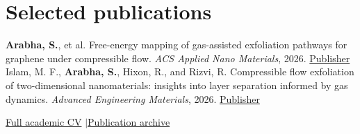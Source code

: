 \documentclass[11pt,letterpaper]{article}
\begin{document}
\section*{Selected publications}
\textbf{Arabha, S.}, et al. Free-energy mapping of gas-assisted exfoliation pathways for graphene under compressible flow. \textit{ACS Applied Nano Materials}, 2026. \href{https://doi.org/10.1021/acsanm.6c01419}{Publisher}\\[5pt]
Islam, M. F., \textbf{Arabha, S.}, Hixon, R., and Rizvi, R. Compressible flow exfoliation of two-dimensional nanomaterials: insights into layer separation informed by gas dynamics. \textit{Advanced Engineering Materials}, 2026. \href{https://doi.org/10.1002/adem.202502168}{Publisher}
\medskip

\href{https://www.saeedarabha.com/AcademicCV}{Full academic CV} \enspace$\vert$\enspace \href{https://www.saeedarabha.com/journal/}{Publication archive}
\end{document}
